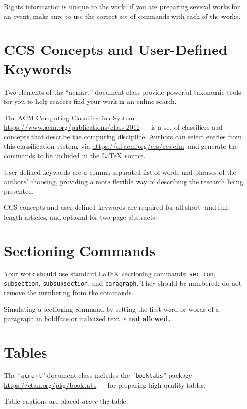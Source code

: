 \documentclass[acmtog]{acmart}
\begin{document}
	Rights information is unique to the work; if you are preparing several
	works for an event, make sure to use the correct set of commands with
	each of the works.
	
	\section{CCS Concepts and User-Defined Keywords}
	
	Two elements of the ``acmart'' document class provide powerful
	taxonomic tools for you to help readers find your work in an online
	search.
	
	The ACM Computing Classification System ---
	\url{https://www.acm.org/publications/class-2012} --- is a set of
	classifiers and concepts that describe the computing
	discipline. Authors can select entries from this classification
	system, via \url{https://dl.acm.org/ccs/ccs.cfm}, and generate the
	commands to be included in the \LaTeX\ source.
	
	User-defined keywords are a comma-separated list of words and phrases
	of the authors' choosing, providing a more flexible way of describing
	the research being presented.
	
	CCS concepts and user-defined keywords are required for all short- and
	full-length articles, and optional for two-page abstracts.
	
	\section{Sectioning Commands}
	
	Your work should use standard \LaTeX\ sectioning commands:
	\verb|section|, \verb|subsection|, \verb|subsubsection|, and
	\verb|paragraph|. They should be numbered; do not remove the numbering
	from the commands.
	
	Simulating a sectioning command by setting the first word or words of
	a paragraph in boldface or italicized text is {\bfseries not allowed.}
	
	\section{Tables}
	
	The ``\verb|acmart|'' document class includes the ``\verb|booktabs|''
	package --- \url{https://ctan.org/pkg/booktabs} --- for preparing
	high-quality tables.
	
	Table captions are placed {\itshape above} the table.
	
\end{document}
